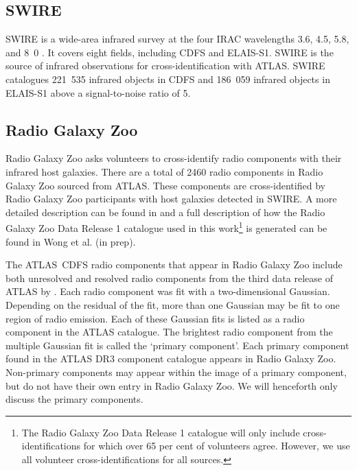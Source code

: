 \documentclass[fleqn,usenatbib,usedcolumn]{mnras}
\begin{document}
  \subsection{SWIRE}\label{sec:swire}

    SWIRE \citep{lonsdale03swire, surace05swire} is a wide-area infrared
    survey at the four IRAC wavelengths 3.6, 4.5, 5.8, and
    \unit{8.0}{\micro\meter} \citep{lonsdale03swire}. It covers eight fields, including CDFS and ELAIS-S1. SWIRE is the source of infrared
    observations for cross-identification with ATLAS. SWIRE catalogues 221~535
    infrared objects in CDFS and 186~059 infrared objects in ELAIS-S1 above a signal-to-noise ratio of 5.

  \subsection{Radio Galaxy Zoo}\label{sec:rgz}

    Radio Galaxy Zoo asks volunteers to cross-identify radio components with
    their infrared host galaxies. There are a total of 2460 radio
    components in Radio Galaxy Zoo sourced from ATLAS. These
    components are cross-identified by Radio Galaxy Zoo participants with host galaxies detected in SWIRE.
    A more detailed description can be found in
    \citet{banfield15} and a full description of how the Radio Galaxy Zoo Data Release 1 catalogue used in this work\footnote{The Radio Galaxy Zoo Data Release 1 catalogue will only include cross-identifications for which over 65 per cent of volunteers
    agree. However, we use all volunteer cross-identifications for all sources.}
    is generated can be found in Wong et al. (in prep).

     The ATLAS~CDFS radio components that appear in Radio Galaxy Zoo include both unresolved and resolved radio components from the third data release of ATLAS by \citet{franzen15}.  Each radio component was fit with a two-dimensional
    Gaussian. Depending on the residual of the fit, more than one Gaussian may
    be fit to one region of radio emission.  Each of these Gaussian fits is
    listed as a radio component in the ATLAS catalogue. The brightest radio
    component from the multiple Gaussian fit is called the `primary
    component'. Each primary component found in the ATLAS DR3 component
    catalogue appears in Radio Galaxy Zoo. Non-primary components may appear
    within the image of a primary component, but do not have their own entry
    in Radio Galaxy Zoo. We will henceforth only discuss the primary
    components.
\end{document}

